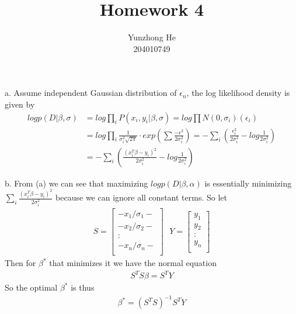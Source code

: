 \documentclass[12pt]{article}
\newenvironment{problem}[2][Problem]{\begin{trivlist}
\item[\hskip \labelsep {\bfseries #1}\hskip \labelsep {\bfseries #2}]}{\end{trivlist}}
\begin{document}
 
 
\title{Homework 4}%
\author{Yunzhong He\\ %
204010749} %
 
\maketitle
 
\begin{problem}{1. Liner Regression with Heterogenous Noise}
\item{a.}
Assume independent Gaussian distribution of $\epsilon_n$, the log likelihood density is given by
\begin{align*}
		logp(D|\beta, \sigma) &= log\prod_iP(x_i, y_i| \beta, \sigma) = log\prod N(0, \sigma_i)(\epsilon_i) \\
		&= log\prod_i \frac{1}{\sigma_i^2 \sqrt{2\pi}} \cdot exp(\sum \frac{-\epsilon^2}{2\sigma_i^2}) = -\sum_i(\frac{\epsilon_i^2}{2\sigma_i^2}-log\frac{1}{2\sigma_i^2}) \\
		&= -\sum_i(\frac{(x_i^T\beta - y_i)^2}{2\sigma_i^2}-log\frac{1}{2\sigma_i^2}) 
\end{align*}
\item{b.}
From (a) we can see that maximizing $logp(D|\beta,\alpha)$ is essentially minimizing $\sum_i\frac{(x_i^T\beta - y_i)^2}{2\sigma_i^2}$ because we can ignore all constant terms. So let
\begin{align*}
    S = \begin{bmatrix}
			- x_1/\sigma_1 -\\ 
			- x_2/\sigma_2 -\\ 
			      :         \\
			- x_n/\sigma_n -\\ 
		\end{bmatrix}
	\ \ \
    Y = \begin{bmatrix}
			y_1\\
			y_2\\
			:\\
			y_n\\
		\end{bmatrix}
\end{align*}
Then for $\beta^*$ that minimizes it we have the normal equation
\begin{align*}
	S^TS\beta = S^TY
\end{align*}
So the optimal $\beta^*$ is thus
\begin{align*}
	\beta^* = (S^TS)^{-1}S^TY
\end{align*}
\end{problem}
\end{document}
